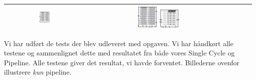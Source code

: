 \documentclass[12pt, a4paper]{article}
\begin{document}
\begin{center}
\begin{tabular}{| c | c | c | c | c | }
	\includegraphics[width=0.14\textwidth]{6-7-8.png} &
	\includegraphics[width=0.14\textwidth]{9.png}
	\includegraphics[width=0.14\textwidth]{s9.png}\\
    \hline
\end{tabular}

\end{center}

Vi har udført de tests der blev udleveret med opgaven. Vi har håndkørt alle testene og sammenlignet dette med resultatet fra både vores Single Cycle og Pipeline. Alle testene giver det resultat, vi havde forventet. Billederne ovenfor illustrere \textit{kun} pipeline.
\end{document}
